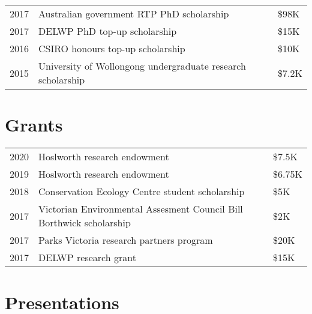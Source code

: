 \documentclass[10pt,a4paper,]{article}
\begin{document}
\begin{tabular}{rll}
  2017 & Australian government RTP PhD scholarship & \$98K \\ 
  2017 & DELWP PhD top-up scholarship & \$15K \\ 
  2016 & CSIRO honours top-up scholarship & \$10K \\ 
  2015 & University of Wollongong undergraduate research scholarship & \$7.2K \\ 
  \end{tabular}

\hypertarget{grants}{%
\section{Grants}\label{grants}}

\begin{tabular}{rll}
  2020 & Hoslworth research endowment & \$7.5K \\ 
  2019 & Hoslworth research endowment & \$6.75K \\ 
  2018 & Conservation Ecology Centre student scholarship & \$5K \\ 
  2017 & Victorian Environmental Assesment Council Bill Borthwick scholarship & \$2K \\ 
  2017 & Parks Victoria research partners program & \$20K \\ 
  2017 & DELWP research grant & \$15K \\ 
  \end{tabular}

\newpage

\hypertarget{presentations}{%
\section{Presentations}\label{presentations}}
\end{document}
